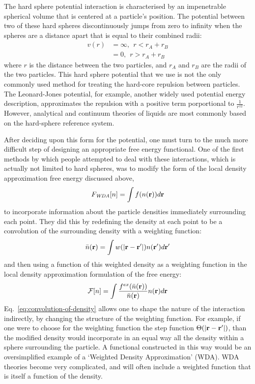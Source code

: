 The hard sphere potential interaction is characterised by an
impenetrable spherical volume that is centered at a particle's
position.  The potential between two of these hard spheres
discontinuously jumps from zero to infinity when the spheres are a
distance apart that is equal to their combined radii:
\begin{align}
  v(r) &= \infty,~~ r < r_A + r_B \\
  &= 0,~~ r > r_A + r_B
\end{align}
where $r$ is the distance between the two particles, and $r_A$ and
$r_B$ are the radii of the two particles.  This hard sphere potential
that we use is not the only commonly used method for treating the
hard-core repulsion between particles.  The Leonard-Jones potential,
for example, another widely used potential energy description,
approximates the repulsion with a positive term porportional to
$\frac{1}{r^{12}}$.  However, analytical and continuum theories of
liquids are most commonly based on the hard-sphere reference system.

After deciding upon this form for the potential, one must turn to the
much more difficult step of designing an appropriate free energy
functional.  One of the first methods by which people attempted to
deal with these interactions, which is actually not limited to hard
spheres, was to modify the form of the local density approximation
free energy discussed above,
\begin{align}
  F_\textit{WDA}[n] = \int f(n(\textbf{r})) d\textbf{r}
\end{align}
to incorporate information about the particle densities immediately
surrounding each point.  They did this by redefining the density at
each point to be a convolution of the surrounding density with a
weighting function:
\begin{align}
  \label{eq:convolution-of-density}
  \bar{n}(\textbf{r}) = \int w(|\textbf{r}-\textbf{r}'|) n(\textbf{r}') d\textbf{r}'
\end{align}
and then using a function of this weighted density as a weighting
function in the local density approximation formulation of the free
energy:
\begin{align}
  \mathcal{F}[n] = \int \frac{f^{ex}(\bar{n}(\textbf{r}))}{\bar{n}(\textbf{r})} n(\textbf{r}) d\textbf{r}
\end{align}
Eq.~\ref{eq:convolution-of-density} allows one to shape the nature of
the interaction indirectly, by changing the structure of the weighting
function.  For example, if one were to choose for the weighting
function the step function $\Theta(|\textbf{r}-\textbf{r}'|)$, than the modified
density would incorporate in an equal way all the density within a
sphere surrounding the particle.  A functional constructed in this way
would be an oversimplified example of a `Weighted Density
Approximation' (WDA).  WDA theories become very complicated, and will
often include a weighted function that is itself a function of the
density\cite{curtin1985weighted}.%


